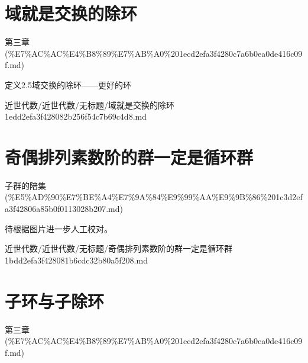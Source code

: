\section*{域就是交换的除环}

\begin{note}[来源上级主题]

第三章 (\%E7\%AC\%AC\%E4\%B8\%89\%E7\%AB\%A0\%201ecd2efa3f4280c7a6b0ea0de416c09f.md)

\end{note}

\begin{note}[域就是交换的除环]

定义2.5域交换的除环——更好的环

\end{note}

\begin{note}[来源路径]

近世代数/近世代数/无标题/域就是交换的除环 1edd2efa3f428082b256f54c7b69c4d8.md

\end{note}

\section*{奇偶排列素数阶的群一定是循环群}

\begin{note}[来源上级主题]

子群的陪集 (\%E5\%AD\%90\%E7\%BE\%A4\%E7\%9A\%84\%E9\%99\%AA\%E9\%9B\%86\%201c3d2efa3f42806a85b0f0113028b207.md)

\end{note}

\begin{note}[奇偶排列素数阶的群一定是循环群]

待根据图片进一步人工校对。

\end{note}

\begin{note}[来源路径]

近世代数/近世代数/无标题/奇偶排列素数阶的群一定是循环群 1bdd2efa3f428081b6cdc32b80a5f208.md

\end{note}

\section*{子环与子除环}

\begin{note}[来源上级主题]

第三章 (\%E7\%AC\%AC\%E4\%B8\%89\%E7\%AB\%A0\%201ecd2efa3f4280c7a6b0ea0de416c09f.md)

\end{note}

